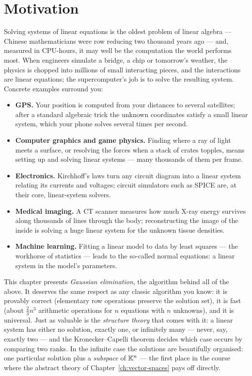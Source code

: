\section{Motivation}

Solving systems of linear equations is the oldest problem of linear algebra — Chinese mathematicians were
row reducing two thousand years ago — and, measured in CPU-hours, it may well be the computation the world
performs most. When engineers simulate a bridge, a chip or tomorrow's weather, the physics is chopped into
millions of small interacting pieces, and the interactions are linear equations; the supercomputer's job
is to solve the resulting system. Concrete examples surround you:

\begin{itemize}
\item \textbf{GPS.} Your position is computed from your distances to several satellites; after a standard
algebraic trick the unknown coordinates satisfy a small linear system, which your phone solves several
times per second.
\item \textbf{Computer graphics and game physics.} Finding where a ray of light meets a surface, or
resolving the forces when a stack of crates topples, means setting up and solving linear systems — many
thousands of them per frame.
\item \textbf{Electronics.} Kirchhoff's laws turn any circuit diagram into a linear system relating its
currents and voltages; circuit simulators such as SPICE are, at their core, linear-system solvers.
\item \textbf{Medical imaging.} A CT scanner measures how much X-ray energy survives along thousands of
lines through the body; reconstructing the image of the inside is solving a huge linear system for the
unknown tissue densities.
\item \textbf{Machine learning.} Fitting a linear model to data by least squares — the workhorse of
statistics — leads to the so-called normal equations: a linear system in the model's parameters.
\end{itemize}

This chapter presents \emph{Gaussian elimination}, the algorithm behind all of the above. It deserves the
same respect as any classic algorithm you know: it is provably correct (elementary row operations preserve
the solution set), it is fast (about $\tfrac23 n^3$ arithmetic operations for $n$ equations with $n$
unknowns), and it is universal. Just as valuable is the \emph{structure theory} that comes with it: a
linear system has either no solution, exactly one, or infinitely many — never, say, exactly two — and the
Kronecker--Capelli theorem decides which case occurs by comparing two ranks. In the infinite case the
solutions are beautifully organised: one particular solution plus a \emph{subspace} of $\mathbb{K}^n$ — the first
place in the course where the abstract theory of Chapter~\ref{ch:vector-spaces} pays off directly.

